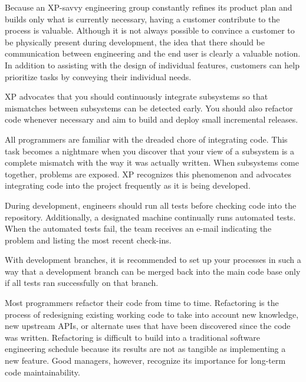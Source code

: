 
Because an XP-savvy engineering group constantly refines its product plan and builds only what is currently necessary, having a customer contribute to the process is valuable. Although it is not always possible to convince a customer to be physically present during development, the idea that there should be communication between engineering and the end user is clearly a valuable notion. In addition to assisting with the design of individual features, customers can help prioritize tasks by conveying their individual needs.


XP advocates that you should continuously integrate subsystems so that mismatches between subsystems can be detected early. You should also refactor code whenever necessary and aim to build and deploy small incremental releases.


All programmers are familiar with the dreaded chore of integrating code. This task becomes a nightmare when you discover that your view of a subsystem is a complete mismatch with the way it was actually written. When subsystems come together, problems are exposed. XP recognizes this phenomenon and advocates integrating code into the project frequently as it is being developed.

During development, engineers should run all tests before checking code into the repository. Additionally, a designated machine continually runs automated tests. When the automated tests fail, the team receives an e-mail indicating the problem and listing the most recent check-ins.

With development branches, it is recommended to set up your processes in such a way that a development branch can be merged back into the main code base only if all tests ran successfully on that branch.


Most programmers refactor their code from time to time. Refactoring is the process of redesigning existing working code to take into account new knowledge, new upstream APIs, or alternate uses that have been discovered since the code was written. Refactoring is difficult to build into a traditional software engineering schedule because its results are not as tangible as implementing a new feature. Good managers, however, recognize its importance for long-term code maintainability.

